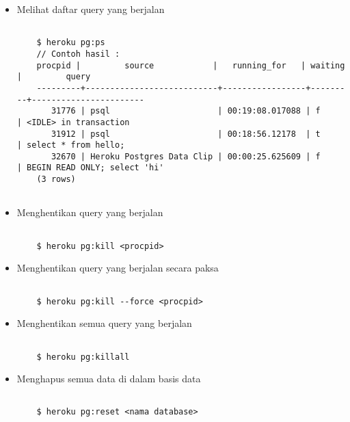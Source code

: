 \begin{itemize}
\begin{lstlisting}
\end{lstlisting}

\item Melihat daftar query yang berjalan

\begin{lstlisting}

	$ heroku pg:ps
	// Contoh hasil :
	procpid |         source            |   running_for   | waiting |         query
	---------+---------------------------+-----------------+---------+-----------------------
	   31776 | psql                      | 00:19:08.017088 | f       | <IDLE> in transaction
	   31912 | psql                      | 00:18:56.12178  | t       | select * from hello;
	   32670 | Heroku Postgres Data Clip | 00:00:25.625609 | f       | BEGIN READ ONLY; select 'hi'
	(3 rows)
	
\end{lstlisting}

\item Menghentikan query yang berjalan

\begin{lstlisting}

	$ heroku pg:kill <procpid>

\end{lstlisting}

\item Menghentikan query yang berjalan secara paksa

\begin{lstlisting}

	$ heroku pg:kill --force <procpid>

\end{lstlisting}

\item Menghentikan semua query yang berjalan

\begin{lstlisting}

	$ heroku pg:killall

\end{lstlisting}

\item Menghapus semua data di dalam basis data

\begin{lstlisting}

	$ heroku pg:reset <nama database>

\end{lstlisting}
\end{itemize}

